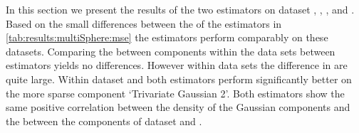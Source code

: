 In this section we present the results of the two estimators on dataset \ferdosiTwo, \baakmanTwo, \ferdosiThree, and \baakmanThree.
	Based on the small differences between the \mses of the estimators in \cref{tab:results:multiSphere:mse} the estimators perform comparably on these datasets. 
	Comparing the \MSE between components within the data sets between estimators yields no differences. However within data sets the difference in \mses are quite large.
	Within dataset \ferdosiTwo and \baakmanTwo both estimators perform significantly better on the more sparse component `Trivariate Gaussian 2'.
	Both estimators show the same positive correlation between the density of the Gaussian components and the \MSE between the components of dataset \ferdosiThree and \baakmanThree.









